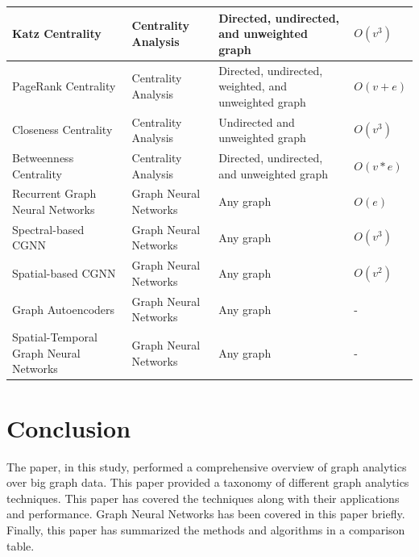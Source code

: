 \documentclass[journal,twoside,web]{ieeecolor}
\begin{document}
\begin{table}[]
\begin{tabular}{l l l l}
    Katz Centrality & Centrality Analysis & Directed, undirected, and unweighted graph & $O(v^3)$  \\ \midrule
    PageRank Centrality & Centrality Analysis & Directed, undirected, weighted, and unweighted graph & $O(v + e)$  \\ \midrule
    Closeness Centrality & Centrality Analysis & Undirected and unweighted graph & $O(v^3)$  \\ \midrule
    Betweenness Centrality & Centrality Analysis & Directed, undirected, and unweighted graph & $O(v * e)$  \\ \midrule
    Recurrent Graph Neural Networks & Graph Neural Networks & Any graph & $O(e)$  \\ \midrule
    Spectral-based CGNN & Graph Neural Networks & Any graph & $O(v^3)$  \\ \midrule
    Spatial-based CGNN & Graph Neural Networks & Any graph & $O(v^2)$  \\ \midrule
    Graph Autoencoders & Graph Neural Networks & Any graph & -  \\ \midrule
    Spatial-Temporal Graph Neural Networks & Graph Neural Networks & Any graph & -  \\
    \bottomrule
    \end{tabular}
\end{table}

\section{Conclusion}
\label{sec:conclusion}
The paper, in this study, performed a comprehensive overview of graph analytics over big graph data. This paper provided a taxonomy of different graph analytics techniques. This paper has covered the techniques along with their applications and performance. Graph Neural Networks has been covered in this paper briefly. Finally, this paper has summarized the methods and algorithms in a comparison table.
\end{document}
